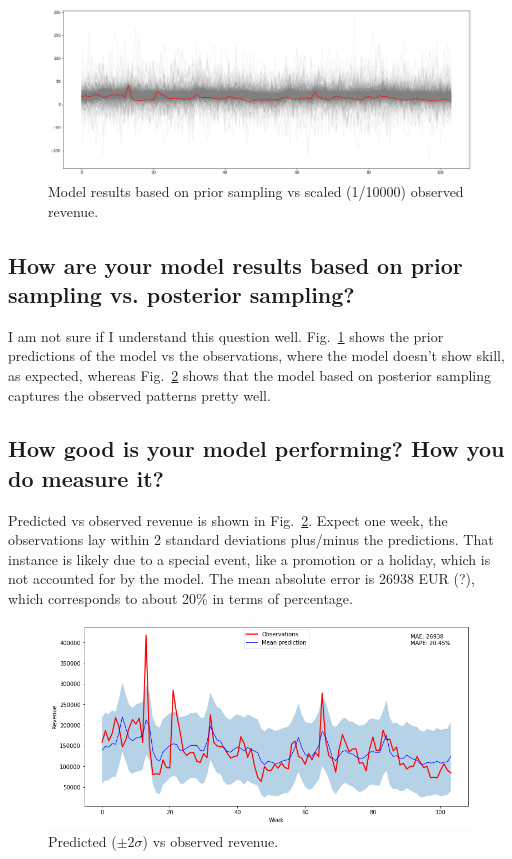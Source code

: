 \documentclass[a4paper,10pt]{scrartcl}
\begin{document}
 
\begin{figure}[!h]
  \centering
  \includegraphics[trim=0mm 0mm 0mm 0mm, clip, width=.8\textwidth]{Prior_prediction.png}
  \caption{Model results based on prior sampling vs scaled (1/10000) observed revenue.}\label{f:pred_prior}
\end{figure}

\FloatBarrier

\subsection {How are your model results based on prior sampling vs. posterior sampling?}
I am not sure if I understand this question well. Fig.~\ref{f:pred_prior} shows the prior predictions of the model vs the observations, where the model doesn't show skill, as expected, whereas Fig.~\ref{f:preds_vs_obs} shows that the model based on posterior sampling captures the observed patterns pretty well.

\subsection {How good is your model performing? How you do measure it?}

Predicted vs observed revenue is shown in Fig.~\ref{f:preds_vs_obs}. Expect one week, the observations lay within 2 standard deviations plus/minus the predictions. That instance is likely due to a special event, like a promotion or a holiday, which is not accounted for by the model. The mean absolute error is 26938 EUR (?), which corresponds to about 20\% in terms of percentage. 

\begin{figure}[!h]
  \centering
  \includegraphics[trim=0mm 0mm 0mm 0mm, clip, width=.8\textwidth]{preds_vs_obs.png}
  \caption{Predicted ($\pm 2\sigma$) vs observed revenue.}\label{f:preds_vs_obs}
\end{figure}
\end{document}
